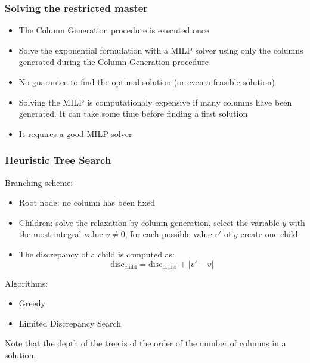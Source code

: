 \documentclass[10pt]{beamer}
\begin{document}
\begin{frame}
  \frametitle{Solving the restricted master}

  \begin{itemize}
    \item The Column Generation procedure is executed once
    \item Solve the exponential formulation with a MILP solver using only the columns generated during the Column Generation procedure
    \item No guarantee to find the optimal solution (or even a feasible solution)
    \item Solving the MILP is computationaly expensive if many columns have been generated. It can take some time before finding a first solution
    \item It requires a good MILP solver 
  \end{itemize}
\end{frame}

\begin{frame}
  \frametitle{Heuristic Tree Search}

  Branching scheme:
  \begin{itemize}
    \item Root node: no column has been fixed
    \item Children: solve the relaxation by column generation, select the variable $y$ with the most integral value $v \neq 0$, for each possible value $v'$ of $y$ create one child.
    \item The discrepancy of a child is computed as:
      \begin{displaymath}
        \mathrm{disc}_\text{child} = \mathrm{disc}_\text{father} + | v' - v |
      \end{displaymath}
  \end{itemize}

  Algorithms:
  \begin{itemize}
    \item Greedy
    \item Limited Discrepancy Search
  \end{itemize}

  Note that the depth of the tree is of the order of the number of columns in a solution.
\end{frame}
\end{document}
